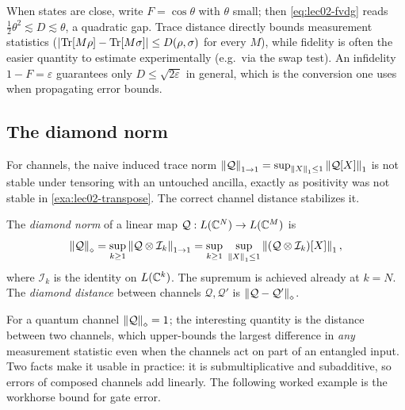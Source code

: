 \begin{remark}\label{rem:lec02-both}
When states are close, write $F=\cos\theta$ with $\theta$ small; then
\eqref{eq:lec02-fvdg} reads $\tfrac12\theta^{2}\lesssim D\lesssim\theta$, a
quadratic gap. Trace distance directly bounds measurement statistics
($\left\lvert \operatorname{Tr}[M\rho]-\operatorname{Tr}[M\sigma] \right\rvert\le D(\rho,\sigma)$ for every $M$), while fidelity
is often the easier quantity to estimate experimentally (e.g.\ via the swap test).
An infidelity $1-F=\varepsilon$ guarantees only $D\le\sqrt{2\varepsilon}$ in
general, which is the conversion one uses when propagating error bounds.
\end{remark}

\subsection{The diamond norm}

For channels, the naive induced trace norm
$\left\lVert \mathcal{Q} \right\rVert_{1\to1}=\sup_{\left\lVert X \right\rVert_1\le1}\left\lVert \mathcal{Q}[X] \right\rVert_1$ is not
stable under tensoring with an untouched ancilla, exactly as positivity was not
stable in \cref{exa:lec02-transpose}. The correct channel distance stabilizes it.

\begin{definition}\label{def:lec02-diamond}
The \emph{diamond norm} of a linear map $\mathcal{Q}:L(\mathbb{C}^{N})\to L(\mathbb{C}^{M})$ is
\begin{equation}\label{eq:lec02-diamond}
  \left\lVert \mathcal{Q} \right\rVert_\diamond
   =\sup_{k\ge1}\left\lVert \mathcal{Q}\otimes\mathcal{I}_k \right\rVert_{1\to1}
   =\sup_{k\ge1}\;\sup_{\left\lVert X \right\rVert_1\le1}\left\lVert (\mathcal{Q}\otimes\mathcal{I}_k)[X] \right\rVert_1 ,
\end{equation}
where $\mathcal{I}_k$ is the identity on $L(\mathbb{C}^{k})$. The supremum is achieved
already at $k=N$. The \emph{diamond distance} between channels
$\mathcal{Q},\mathcal{Q}'$ is $\left\lVert \mathcal{Q}-\mathcal{Q}' \right\rVert_\diamond$.
\end{definition}

For a quantum channel $\left\lVert \mathcal{Q} \right\rVert_\diamond=1$; the interesting quantity is
the distance between two channels, which upper-bounds the largest difference in
\emph{any} measurement statistic even when the channels act on part of an
entangled input. Two facts make it usable in practice: it is submultiplicative and
subadditive, so errors of composed channels add linearly. The following worked
example is the workhorse bound for gate error.

